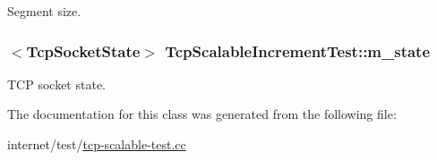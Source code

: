 Segment size. 

\subsubsection[{\texorpdfstring{m\+\_\+state}{m_state}}]{$<${\bf Tcp\+Socket\+State}$>$ Tcp\+Scalable\+Increment\+Test\+::m\+\_\+state\hspace{0.3cm}{\ttfamily [private]}}\hypertarget{classTcpScalableIncrementTest_a872e97f9b38599ef388c3734b42219ed}{}\label{classTcpScalableIncrementTest_a872e97f9b38599ef388c3734b42219ed}


T\+CP socket state. 



The documentation for this class was generated from the following file\+:\begin{DoxyCompactItemize}
\item 
internet/test/\hyperlink{tcp-scalable-test_8cc}{tcp-\/scalable-\/test.\+cc}\end{DoxyCompactItemize}
